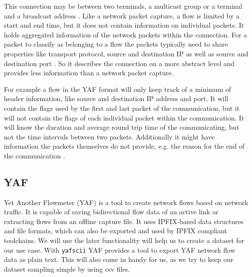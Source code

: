 \documentclass[
	ngerman,
	ruledheaders=section,%
	class=report,%
	thesis={type=bachelor},%
	accentcolor=9c,%
	custommargins=true,%
	marginpar=false,%
	parskip=half-,%
	fontsize=11pt,%
]{tudapub}
\let\code\texttt
\begin{document}
This connection may be between two terminals, a multicast group or a terminal and a broadcast address \cite{rajahalmeIPv6FlowLabel}.
Like a network packet capture, a flow is limited by a start and end time,
but it does not contain information on individual packets.
It holds aggregated information of the network packets within the connection.
For a packet to classify as belonging to a flow the packets typically need to share properties like transport protocol, source and destination IP as well as source and destination port \cite{FlowbasedNetworkTraffic} \cite{claiseSpecificationIPFlow}.
So it describes the connection on a more abstract level and provides less information than a network packet capture.

For example a flow in the YAF format will only keep track of a minimum of header information, like source and destination IP address and port.
It will contain the flags used by the first and last packet of the communication,
but it will not contain the flags of each individual packet within the communication.
It will know the duration and average round trip time of the communicating, but not the time intervals between two packets.
Additionally it might have information the packets themselves do not provide, e.g. the reason for the end of the communication \cite{YAFDocumentation}.


\subsection{YAF}
\label{sec:yaf}

Yet Another Flowmeter (YAF) is a tool to create network flows based on network traffic.
It is capable of saving bidirectional flow data of an active link or extracting flows from an offline capture file.
It uses IPFIX-based data structures and file formats, which can also be exported and used by IPFIX compliant toolchains.
We will use the later functionality will help us to create a dataset for our use case.
With \code{yafscii} YAF provides a tool to export YAF network flow data as plain text.
This will also come in handy for us, as we try to keep our dataset sampling simple by using csv files.
\end{document}
